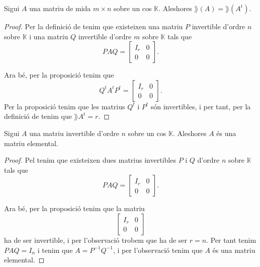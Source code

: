 \documentclass[../../Main.tex]{subfiles}
\begin{document}
	\begin{proposition}
		\label{prop:rang de la matriu transposada és el rang de la matriu}
		Sigui \(A\) una matriu de mida \(m\times n\) sobre un cos \(\mathbb{K}\). Aleshores \(\rang(A)=\rang(A^{t})\).
		\begin{proof}
			Per la definició de  tenim que existeixen una matriu \(P\) invertible d'ordre \(n\) sobre \(\mathbb{K}\) i una matriu \(Q\) invertible d'ordre \(m\) sobre \(\mathbb{K}\) tals que
			\[PAQ=\left[\begin{array}{c|c}
			I_{r} & 0 \\\hline
			0 & 0
			\end{array}\right].\]
			
			Ara bé, per la proposició  tenim que
			\[Q^{t}A^{t}P^{t}=\left[\begin{array}{c|c}
			I_{r} & 0 \\\hline
			0 & 0
			\end{array}\right].\]
			Per la proposició  tenim que les matrius \(Q^{t}\) i \(P^{t}\) són invertibles, i per tant, per la definició de  tenim que \(\rang{A^{t}}=r\).
		\end{proof}
	\end{proposition}
	\begin{proposition}
		\label{prop:una matriu invertible és producte de matrius elementals}
		Sigui \(A\) una matriu invertible d'ordre \(n\) sobre un cos \(\mathbb{K}\). Aleshores \(A\) és una matriu elemental.
		\begin{proof}
			Pel  tenim que existeixen dues matrius invertibles \(P\) i \(Q\) d'ordre \(n\) sobre \(\mathbb{K}\) tals que
			\[PAQ=\left[\begin{array}{c|c}
			I_{r} & 0\\\hline
			0 & 0
			\end{array}\right].\]
			
			Ara bé, per la proposició  tenim que la matriu
			\[\left[\begin{array}{c|c}
			I_{r} & 0\\\hline
			0 & 0
			\end{array}\right]\]
			ha de ser invertible, i per l'observació  trobem que ha de ser \(r=n\). Per tant tenim \(PAQ=I_{n}\) i tenim que \(A=P^{-1}Q^{-1}\), i per l'observació  tenim que \(A\) és una matriu elemental.
		\end{proof}
	\end{proposition}
\end{document}

